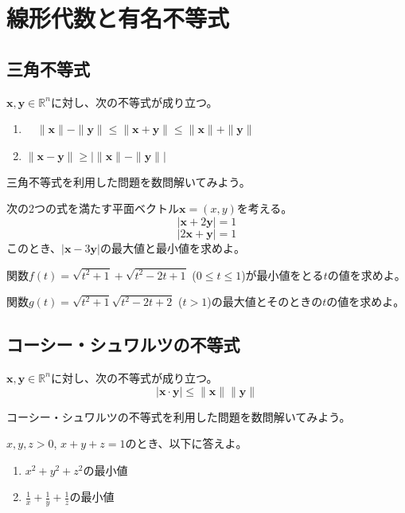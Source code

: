 \documentclass{jlreq}
\begin{document}
\section{線形代数と有名不等式}
\subsection{三角不等式}
\begin{theorembox}[三角不等式]
	$\boldsymbol{x}, \boldsymbol{y} \in \mathbb{R}^n$に対し、次の不等式が成り立つ。
	\begin{enumerate}
		\item 　$\| \boldsymbol{x} \| - \| \boldsymbol{y} \| \leq \| \boldsymbol{x} + \boldsymbol{y} \| \leq \| \boldsymbol{x} \| + \| \boldsymbol{y} \|$
		\item $\| \boldsymbol{x} - \boldsymbol{y} \| \geq | \| \boldsymbol{x} \| - \| \boldsymbol{y} \| |$
	\end{enumerate}
\end{theorembox}

三角不等式を利用した問題を数問解いてみよう。

\begin{problem}
	次の2つの式を満たす平面ベクトル$\boldsymbol{x} = (x, y)$を考える。
	\begin{equation*}
		|\boldsymbol{x} + 2\boldsymbol{y}| = 1
	\end{equation*}	
	\begin{equation*}
		|2\boldsymbol{x} + \boldsymbol{y}| = 1
	\end{equation*}
	このとき、$|\boldsymbol{x} - 3 \boldsymbol{y}|$の最大値と最小値を求めよ。
\end{problem}

\begin{problem}
	関数$f(t) = \sqrt{t^2 + 1} + \sqrt{t^2 - 2t + 1}$ ($0 \leq t \leq 1$)が最小値をとる$t$の値を求めよ。
\end{problem}

\begin{problem}
	関数$g(t) = \sqrt{t^2 + 1}  \sqrt{t^2 - 2 t + 2}$ ($t > 1$)の最大値とそのときの$t$の値を求めよ。
\end{problem}

\subsection{コーシー・シュワルツの不等式}

\begin{theorembox}
	$\boldsymbol{x}, \boldsymbol{y} \in \mathbb{R}^n$に対し、次の不等式が成り立つ。
	\begin{equation*}
		| \boldsymbol{x} \cdot \boldsymbol{y} | \leq \| \boldsymbol{x} \| \| \boldsymbol{y} \|
	\end{equation*}
\end{theorembox}

コーシー・シュワルツの不等式を利用した問題を数問解いてみよう。

\begin{problem}
	$x, y, z > 0$, $x + y + z = 1$のとき、以下に答えよ。
	\begin{enumerate}
		\item $x^2 + y^2 + z^2$の最小値
		\item $\frac{1}{x} + \frac{1}{y} + \frac{1}{z}$の最小値
	\end{enumerate}
\end{problem}
\end{document}
